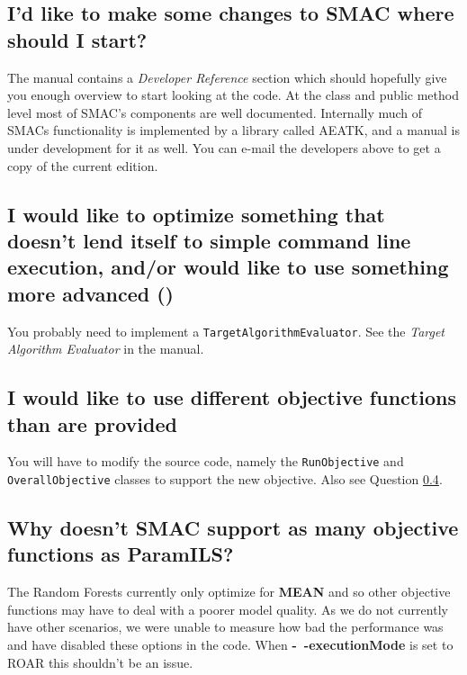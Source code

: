 \documentclass[11pt,letterpaper,oneside]{article}
\begin{document}

	
	
\subsection{I'd like to make some changes to SMAC where should I start?}

	The manual contains a \emph{Developer Reference} section which should hopefully give you enough overview to start looking at the code. At the class and public method level most of SMAC's components are well documented. Internally much of SMACs functionality is implemented by a library called AEATK, and a manual is under development for it as well. You can e-mail the developers above to get a copy of the current edition.

\subsection{I would like to optimize something that doesn't lend itself to simple command line execution, and/or would like to use something more advanced ()}

	You probably need to implement a \texttt{TargetAlgorithmEvaluator}. See the \emph{Target Algorithm Evaluator} in the manual.

\subsection{I would like to use different objective functions than are provided}

	You will have to modify the source code, namely the \texttt{RunObjective} and \texttt{OverallObjective} classes to support the new objective. Also see Question \ref{sec:rf-objectives}.

\subsection{Why doesn't SMAC support as many objective functions as ParamILS?}
\label{sec:rf-objectives}

	The Random Forests currently only optimize for \textbf{MEAN} and so other objective functions may have to deal with a poorer model quality. As we do not currently have other scenarios, we were unable to measure how bad the performance was and have disabled these options in the code. When \textbf{-~$\!$-executionMode} is set to ROAR this shouldn't be an issue.
\end{document}

